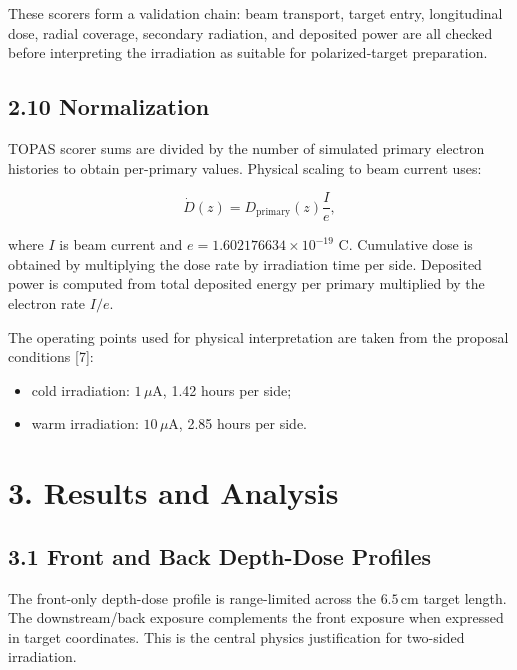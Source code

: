 \documentclass[
  12pt,
]{article}
\providecommand{\tightlist}{%
  \setlength{\itemsep}{0pt}\setlength{\parskip}{0pt}}
\begin{document}
These scorers form a validation chain: beam transport, target entry,
longitudinal dose, radial coverage, secondary radiation, and deposited
power are all checked before interpreting the irradiation as suitable
for polarized-target preparation.

\hypertarget{normalization}{%
\subsection{2.10 Normalization}\label{normalization}}

TOPAS scorer sums are divided by the number of simulated primary
electron histories to obtain per-primary values. Physical scaling to
beam current uses:

\[
\dot{D}(z) = D_{\mathrm{primary}}(z)\frac{I}{e},
\]

where \(I\) is beam current and \(e = 1.602176634 \times 10^{-19}\) C.
Cumulative dose is obtained by multiplying the dose rate by irradiation
time per side. Deposited power is computed from total deposited energy
per primary multiplied by the electron rate \(I/e\).

The operating points used for physical interpretation are taken from the
proposal conditions {[}7{]}:

\begin{itemize}
\tightlist
\item
  cold irradiation: \(1\,\mu\mathrm{A}\), 1.42 hours per side;
\item
  warm irradiation: \(10\,\mu\mathrm{A}\), 2.85 hours per side.
\end{itemize}

\hypertarget{results-and-analysis}{%
\section{3. Results and Analysis}\label{results-and-analysis}}

\hypertarget{front-and-back-depth-dose-profiles}{%
\subsection{3.1 Front and Back Depth-Dose
Profiles}\label{front-and-back-depth-dose-profiles}}

The front-only depth-dose profile is range-limited across the
\(6.5\,\mathrm{cm}\) target length. The downstream/back exposure
complements the front exposure when expressed in target coordinates.
This is the central physics justification for two-sided irradiation.
\end{document}
